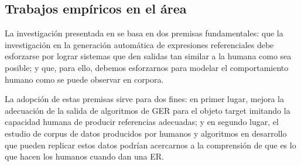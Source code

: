 






\subsection{Trabajos emp\'iricos en el \'area}


La investigaci\'on presentada en \cite{viethen-phd} se basa en dos premisas fundamentales: que la investigaci\'on
en la generaci\'on autom\'atica de expresiones referenciales debe esforzarse por lograr
sistemas que den salidas tan similar a la humana como sea posible; y que, para ello, debemos
esforzarnos para modelar el comportamiento humano como se puede observar en corpora.

La adopci\'on de estas premisas sirve para dos fines: en primer lugar, mejora la adecuaci\'on
de la salida de algoritmos de GER para el objeto target imitando la capacidad humana
de producir referencias adecuadas; y en segundo lugar, el estudio de corpus de datos producidos por humanos
 y algoritmos en desarrollo que pueden replicar estos datos podr\'ian
acercarnos a la comprensi\'on de que es lo que hacen los humanos cuando dan una ER.\\

